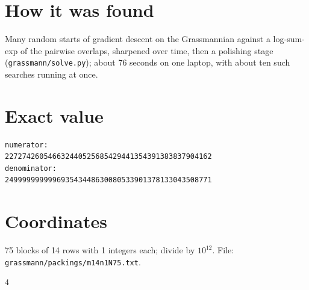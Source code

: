 \documentclass[11pt,a4paper]{article}
\begin{document}
\section{How it was found}
Many random starts of gradient descent on the Grassmannian against a log-sum-exp of the pairwise overlaps, sharpened over time, then a polishing stage (\texttt{grassmann/solve.py}); about 76 seconds on one laptop, with about ten such searches running at once.


\appendix
\section{Exact value}
{\small
\begin{verbatim}
numerator:
227274260546632440525685429441354391383837904162
denominator:
249999999999693543448630080533901378133043508771
\end{verbatim}}

\section{Coordinates}
75 blocks of 14 rows with 1 integers each; divide by $10^{12}$. File: \texttt{grassmann/packings/m14n1N75.txt}.
{\tiny
\begin{multicols}{4}
\end{multicols}}
\end{document}
